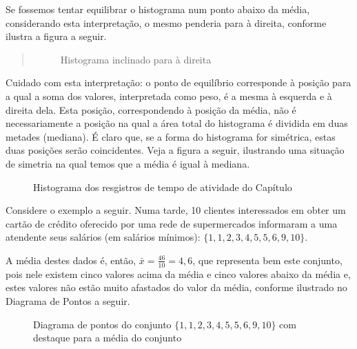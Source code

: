 Se fossemos tentar equilibrar o histograma num ponto abaixo da média, considerando esta interpretação, o mesmo penderia para à direita, conforme ilustra a figura a seguir.
\begin{quote}

\begin{figure}[H]
\centering
\capstart

\noindent{}
\caption{Histograma inclinado para à direita}\label{\detokenize{PE104-1:id3}}\label{\detokenize{PE104-1:id10}}\end{figure}
\end{quote}

Cuidado com esta interpretação: o ponto de equilíbrio corresponde à posição para a qual a soma dos valores, interpretada como peso, é a mesma à esquerda e à direita dela. Esta posição, correspondendo à posição da média, não é necessariamente a posição na qual a área total do histograma é dividida em duas metades (mediana). É claro que, se a forma do histograma for simétrica, estas duas posições serão coincidentes. Veja a figura a seguir, ilustrando uma situação de simetria na qual temos que a média é igual à mediana.

\begin{figure}[H]
\centering
\capstart

\noindent{}
\caption{Histograma dos resgistros de tempo de atividade do Capítulo }\label{\detokenize{PE104-1:fig-simetria}}\label{\detokenize{PE104-1:id11}}\end{figure}

Considere o exemplo a seguir. Numa tarde, 10 clientes interessados em obter um cartão de crédito oferecido por uma rede de supermercados informaram a uma atendente seus salários (em salários mínimos): \(\{1, 1, 2, 3, 4, 5, 5, 6, 9, 10\}\).

A média destes dados é, então, \(\bar{x}=\frac{46}{10}=4,6\), que representa bem este conjunto, pois nele existem cinco valores acima da média e cinco valores abaixo da média e, estes valores não estão muito afastados do valor da média, conforme ilustrado no Diagrama de Pontos a seguir.

\begin{figure}[H]
\centering
\capstart

\noindent{}
\caption{Diagrama de pontos do conjunto \(\{1, 1, 2, 3, 4, 5, 5, 6, 9, 10\}\) com destaque para a média do conjunto}\label{\detokenize{PE104-1:fig-diagramadepontos-media-sem-outlier}}\label{\detokenize{PE104-1:id12}}\end{figure}

